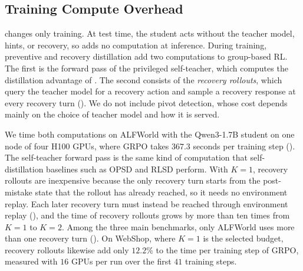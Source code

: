 \subsection{Training Compute Overhead}
\label{app:compute}

\method{} changes only training. At test time, the student acts without the teacher model, hints, or recovery, so \method{} adds no computation at inference. During training, preventive and recovery distillation add two computations to group-based RL. The first is the forward pass of the privileged self-teacher, which computes the distillation advantage of . The second consists of the \emph{recovery rollouts}, which query the teacher model for a recovery action and sample a recovery response at every recovery turn (). We do not include pivot detection, whose cost depends mainly on the choice of teacher model and how it is served.

We time both computations on ALFWorld with the Qwen3-1.7B student on one node of four H100 GPUs, where GRPO takes $367.3$ seconds per training step (). The self-teacher forward pass is the same kind of computation that self-distillation baselines such as OPSD and RLSD perform. With $K = 1$, recovery rollouts are inexpensive because the only recovery turn starts from the post-mistake state that the rollout has already reached, so it needs no environment replay. Each later recovery turn must instead be reached through environment replay (), and the time of recovery rollouts grows by more than ten times from $K = 1$ to $K = 2$. Among the three main benchmarks, only ALFWorld uses more than one recovery turn (). On WebShop, where $K = 1$ is the selected budget, recovery rollouts likewise add only $12.2\%$ to the time per training step of GRPO, measured with $16$ GPUs per run over the first $41$ training steps.

